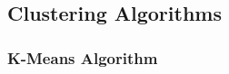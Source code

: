 \subsection{Clustering Algorithms} \label{tes:sec:clu}
%
\subsubsection{K-Means Algorithm}\label{tes:ssec:kma}
